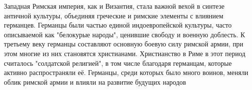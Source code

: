 Западная Римская империя, как и Византия, стала важной вехой в синтезе античной культуры, объединяя греческие и римские элементы с влиянием германцев. Германцы были частью единой индоевропейской культуры, часто описываемой как "белокурые народы", ценившие свободу и военную доблесть. К третьему веку германцы составляют основную боевую силу римской армии, при этом многие из них становятся христианами. Христианство в Риме в этот период считалось "солдатской религией", в том числе благодаря германцам, которые активно распространяли её. Германцы, среди которых было много воинов, меняли облик римской армии и влияли на развитие будущих народов



